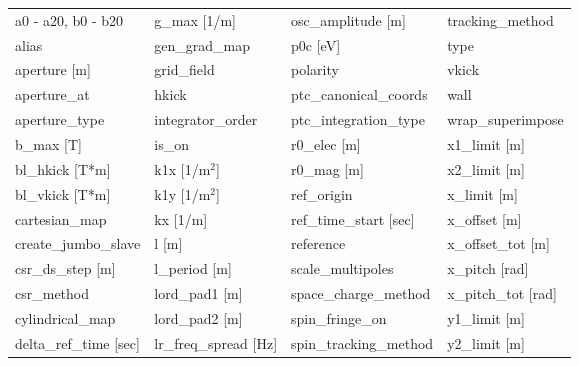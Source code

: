 \begin{tabular}{llll} \toprule
a0 - a20, b0 - b20               & g_max [1/m]                      & osc_amplitude [m]                & tracking_method                  \\
alias                            & gen_grad_map                     & p0c [eV]                         & type                             \\
aperture [m]                     & grid_field                       & polarity                         & vkick                            \\
aperture_at                      & hkick                            & ptc_canonical_coords             & wall                             \\
aperture_type                    & integrator_order                 & ptc_integration_type             & wrap_superimpose                 \\
b_max [T]                        & is_on                            & r0_elec [m]                      & x1_limit [m]                     \\
bl_hkick [T*m]                   & k1x [1/m$^2$]                    & r0_mag [m]                       & x2_limit [m]                     \\
bl_vkick [T*m]                   & k1y [1/m$^2$]                    & ref_origin                       & x_limit [m]                      \\
cartesian_map                    & kx [1/m]                         & ref_time_start [sec]             & x_offset [m]                     \\
create_jumbo_slave               & l [m]                            & reference                        & x_offset_tot [m]                 \\
csr_ds_step [m]                  & l_period [m]                     & scale_multipoles                 & x_pitch [rad]                    \\
csr_method                       & lord_pad1 [m]                    & space_charge_method              & x_pitch_tot [rad]                \\
cylindrical_map                  & lord_pad2 [m]                    & spin_fringe_on                   & y1_limit [m]                     \\
delta_ref_time [sec]             & lr_freq_spread [Hz]              & spin_tracking_method             & y2_limit [m]                     \\

\end{tabular}
